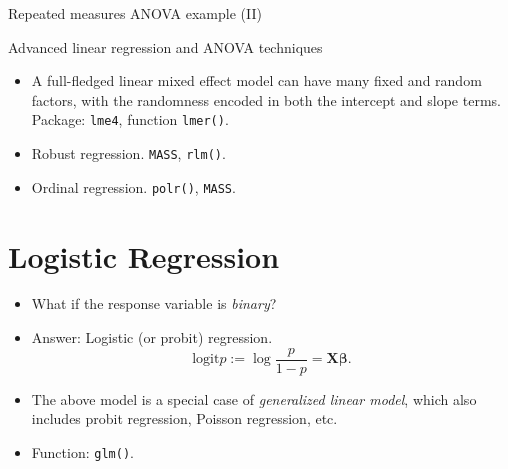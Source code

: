 \begin{frame}[fragile]{Repeated measures ANOVA example (II)}
\begin{knitrout}\footnotesize
{}\color{fgcolor}\begin{kframe}
\begin{alltt}
 \hlkwb{<-}  \hlopt{~}  \hlopt{+}  
 \hlkwb{<-}  \hlopt{~} \hlopt{+} \hlopt{+}  

 \hlopt{~}  \hlopt{|}  
\end{alltt}
\end{kframe}
\end{knitrout}
\end{frame}

\begin{frame}{Advanced linear regression and ANOVA techniques}
  \begin{itemize}
  \item A full-fledged linear mixed effect model can have many fixed
    and random factors, with the randomness encoded in both the
    intercept and slope terms. Package: \texttt{lme4}, function
    \texttt{lmer()}.
  \item Robust regression. \texttt{MASS}, \texttt{rlm()}.
  \item Ordinal regression.  \texttt{polr()}, \texttt{MASS}.
  \end{itemize}
\end{frame}

\section{Logistic Regression}
\label{sec:logistic-models}

\begin{frame}
\begin{itemize}
\item What if the response variable is \emph{binary}?
\item Answer: Logistic (or probit) regression.
  \begin{equation}
    \label{eq:logistic}
    \mathrm{logit} p := \log\frac{p}{1-p} = \mathbf{X}\bm{\beta}.
  \end{equation}
\item The above model is a special case of \emph{generalized linear
    model}, which also includes probit regression, Poisson regression,
  etc.
\item Function: \texttt{glm()}. 
\end{itemize}
\end{frame}

